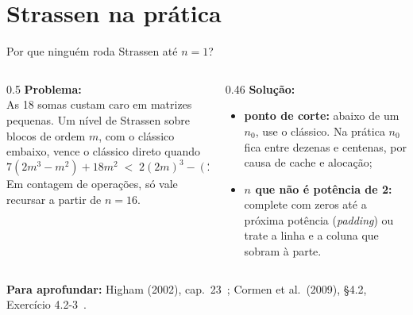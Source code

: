 \documentclass[aspectratio=169,xcolor=table]{beamer}
\newcommand{\fonte}[1]{%
  \vfill
  {\tiny\color{gray!55!black}\textbf{Para aprofundar:} #1\par}%
}
\begin{document}
\section{Strassen na prática}

\begin{frame}{Por que ninguém roda Strassen até $n=1$?}
  \begin{columns}[T]
    \begin{column}{0.5\textwidth}
      \textbf{Problema:}\\
      \scriptsize As 18 somas custam caro em matrizes pequenas. Um nível de Strassen sobre
      blocos de ordem $m$, com o clássico embaixo, vence o clássico direto quando
      \[ 7(2m^3-m^2)+18m^2 \;<\; 2(2m)^3-(2m)^2 \iff m > 7{,}5. \]
      Em contagem de operações, só vale recursar a partir de $n=16$.
    \end{column}
    \begin{column}{0.46\textwidth}
      \textbf{Solução:}\\
      \begin{itemize}\scriptsize
        \item \textbf{ponto de corte:} abaixo de um $n_0$, use o clássico. Na prática $n_0$
              fica entre dezenas e centenas, por causa de cache e alocação;
        \item \textbf{$n$ que não é potência de 2:} complete com zeros até a próxima
              potência (\emph{padding}) ou trate a linha e a coluna que sobram à parte.
      \end{itemize}
    \end{column}
  \end{columns}
  \fonte{Higham (2002), cap.~23~\cite{higham2002accuracy};
    Cormen et al.\ (2009), \S 4.2, Exercício 4.2-3~\cite{cormen2009introduction}.}
\end{frame}
\end{document}
